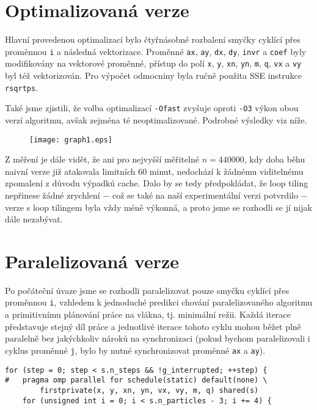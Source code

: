 \documentclass[10pt,a4paper]{article}
\begin{document}
\section{Optimalizovaná verze}

Hlavní provedenou optimalizací bylo čtyřnásobné rozbalení smyčky cyklící přes
proměnnou \texttt{i} a následná vektorizace. Proměnné \texttt{ax}, \texttt{ay},
\texttt{dx}, \texttt{dy}, \texttt{invr} a \texttt{coef} byly modifikovány na
vektorové proměnné, přístup do polí \texttt{x}, \texttt{y}, \texttt{xn},
\texttt{yn}, \texttt{m}, \texttt{q}, \texttt{vx} a \texttt{vy} byl též
vektorizován. Pro výpočet odmocniny byla ručně použita SSE instrukce
\texttt{rsqrtps}.

Také jsme zjistili, že volba optimalizací \texttt{-Ofast} zvyšuje oproti
\texttt{-O3} výkon obou verzí algoritmu, avšak zejména té neoptimalizované.
Podrobné výsledky viz níže.

\begin{figure}[h]
    \centering
    \texttt{[image: graph1.eps]}
    \label{fig:1}
\end{figure}

Z měření je dále vidět, že ani pro nejvyšší měřitelné $ n = 440000 $, kdy doba
běhu naivní verze již atakovala limitních 60 minut, nedochází k žádnému
viditelnému zpomalení z důvodu výpadků cache. Dalo by se tedy předpokládat,
že loop tiling nepřinese žádné zrychlení $ - $ což se také na naší
experimentální verzi potvrdilo $ - $ verze s loop tilingem byla vždy méně
výkonná, a proto jsme se rozhodli se jí nijak dále nezabývat.

\section{Paralelizovaná verze}

Po počáteční úvaze jsme se rozhodli paralelizovat pouze smyčku cyklící
přes proměnnou \texttt{i}, vzhledem k jednoduché predikci chování
paralelizovaného algoritmu a primitivnímu plánování práce na vlákna, tj.
minimální režii. Každá iterace představuje stejný díl práce a jednotlivé
iterace tohoto cyklu mohou běžet plně paralelně bez jakýchkoliv nároků na
synchronizaci (pokud bychom paralelizovali i cyklus proměnné \texttt{j},
bylo by nutné synchronizovat proměnné \texttt{ax} a \texttt{ay}).

\begin{lstlisting}
for (step = 0; step < s.n_steps && !g_interrupted; ++step) {
#   pragma omp parallel for schedule(static) default(none) \
        firstprivate(x, y, xn, yn, vx, vy, m, q) shared(s)
    for (unsigned int i = 0; i < s.n_particles - 3; i += 4) {
\end{lstlisting}
\end{document}
